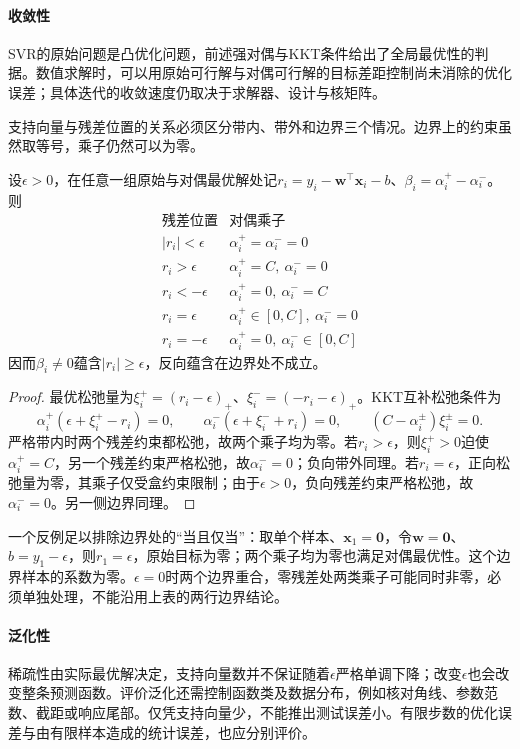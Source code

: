 \paragraph{收敛性}
SVR的原始问题是凸优化问题，前述强对偶与KKT条件给出了全局最优性的判据。数值求解时，可以用原始可行解与对偶可行解的目标差距控制尚未消除的优化误差；具体迭代的收敛速度仍取决于求解器、设计与核矩阵。

支持向量与残差位置的关系必须区分带内、带外和边界三个情况。边界上的约束虽然取等号，乘子仍然可以为零。

\begin{theorem}[SVR的样本系数与残差]
  \label{thm:regression-svr-support}
  设$\epsilon>0$，在任意一组原始与对偶最优解处记$r_i=y_i-\bm{w}^{\top}\bm{x}_i-b$、$\beta_i=\alpha_i^+-\alpha_i^-$。则
  \[
    \begin{array}{c|c}
      \text{残差位置}&\text{对偶乘子}\\ \hline
      |r_i|<\epsilon&\alpha_i^+=\alpha_i^-=0\\
      r_i>\epsilon&\alpha_i^+=C,\ \alpha_i^-=0\\
      r_i<-\epsilon&\alpha_i^+=0,\ \alpha_i^-=C\\
      r_i=\epsilon&\alpha_i^+\in[0,C],\ \alpha_i^-=0\\
      r_i=-\epsilon&\alpha_i^+=0,\ \alpha_i^-\in[0,C]
    \end{array}
  \]
  因而$\beta_i\ne0$蕴含$|r_i|\geq\epsilon$，反向蕴含在边界处不成立。
\end{theorem}

\begin{proof}
最优松弛量为$\xi_i^+=(r_i-\epsilon)_+$、$\xi_i^-=(-r_i-\epsilon)_+$。KKT互补松弛条件为
\[
  \alpha_i^+(\epsilon+\xi_i^+-r_i)=0,\qquad
  \alpha_i^-(\epsilon+\xi_i^-+r_i)=0,\qquad
  (C-\alpha_i^\pm)\xi_i^\pm=0.
\]
严格带内时两个残差约束都松弛，故两个乘子均为零。若$r_i>\epsilon$，则$\xi_i^+>0$迫使$\alpha_i^+=C$，另一个残差约束严格松弛，故$\alpha_i^-=0$；负向带外同理。若$r_i=\epsilon$，正向松弛量为零，其乘子仅受盒约束限制；由于$\epsilon>0$，负向残差约束严格松弛，故$\alpha_i^-=0$。另一侧边界同理。
\end{proof}

一个反例足以排除边界处的“当且仅当”：取单个样本、$\bm{x}_1=\bm{0}$，令$\bm{w}=\bm{0}$、$b=y_1-\epsilon$，则$r_1=\epsilon$，原始目标为零；两个乘子均为零也满足对偶最优性。这个边界样本的系数为零。$\epsilon=0$时两个边界重合，零残差处两类乘子可能同时非零，必须单独处理，不能沿用上表的两行边界结论。

\paragraph{泛化性}
稀疏性由实际最优解决定，支持向量数并不保证随着$\epsilon$严格单调下降；改变$\epsilon$也会改变整条预测函数。评价泛化还需控制函数类及数据分布，例如核对角线、参数范数、截距或响应尾部。仅凭支持向量少，不能推出测试误差小。有限步数的优化误差与由有限样本造成的统计误差，也应分别评价。

